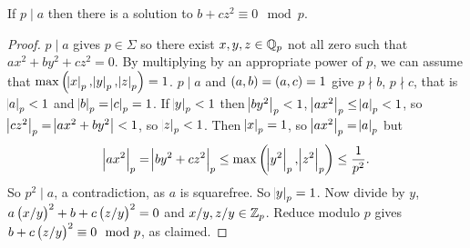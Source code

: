 \pagebreak


\begin{lemma}
If $ p \mid a $ then there is a solution to $ b + cz^2 \equiv 0 \mod p $.
\end{lemma}

\begin{proof}
$ p \mid a $ gives $ p \in \Sigma $ so there exist $ x, y, z \in \mathbb{Q}_p $ not all zero such that $ ax^2 + by^2 + cz^2 = 0 $. By multiplying by an appropriate power of $ p $, we can assume that $ \max\br{\abs{x}_p, \abs{y}_p, \abs{z}_p} = 1 $. $ p \mid a $ and $ \br{a, b} = \br{a, c} = 1 $ give $ p \nmid b $, $ p \nmid c $, that is $ \abs{a}_p < 1 $ and $ \abs{b}_p = \abs{c}_p = 1 $. If $ \abs{y}_p < 1 $ then $ \abs{by^2}_p < 1 $, $ \abs{ax^2}_p \le \abs{a}_p < 1 $, so $ \abs{cz^2}_p = \abs{ax^2 + by^2} < 1 $, so $ \abs{z}_p < 1 $. Then $ \abs{x}_p = 1 $, so $ \abs{ax^2}_p = \abs{a}_p $ but
$$ \abs{ax^2}_p = \abs{by^2 + cz^2}_p \le \max\br{\abs{y^2}_p, \abs{z^2}_p} \le \dfrac{1}{p^2}. $$
So $ p^2 \mid a $, a contradiction, as $ a $ is squarefree. So $ \abs{y}_p = 1 $. Now divide by $ y $, $ a\br{x / y}^2 + b + c\br{z / y}^2 = 0 $ and $ x / y, z / y \in \mathbb{Z}_p $. Reduce modulo $ p $ gives $ b + c\br{z / y}^2 \equiv 0 \mod p $, as claimed.
\end{proof}

